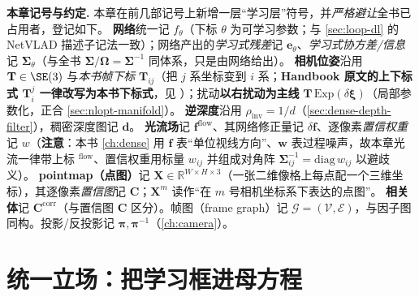 \begin{note}
\textbf{本章记号与约定.}\;
本章在前几部记号上新增一层“学习层”符号，并\emph{严格避让}全书已占用者，登记如下。
\textbf{网络}统一记 $f_\theta$（下标 $\theta$ 为可学习参数；与 \cref{sec:loop-dl} 的 NetVLAD 描述子记法一致）；网络产出的\emph{学习式残差}记 $\mathbf{e}_\theta$、\emph{学习式协方差/信息}记 $\boldsymbol\Sigma_\theta$（与全书 $\boldsymbol\Sigma/\boldsymbol\Omega=\boldsymbol\Sigma^{-1}$ 同体系，只是由网络给出）。
\textbf{相机位姿}沿用 $\mathbf{T}\in\SE(3)$ 与\emph{本书帧下标} $\mathbf{T}_{ij}$（把 $j$ 系坐标变到 $i$ 系；\textbf{Handbook 原文的上下标式 $\mathbf{T}_i^j$ 一律改写为本书下标式}，见 ）；扰动\textbf{以右扰动为主线} $\mathbf{T}\,\mathrm{Exp}(\delta\boldsymbol\xi)$（局部参数化，正合 \cref{sec:nlopt-manifold}）。
\textbf{逆深度}沿用 $\rho_{\mathrm{inv}}=1/d$（\cref{sec:dense-depth-filter}），稠密深度图记 $\mathbf{d}$。
\textbf{光流场}记 $\mathbf{f}^{\mathrm{flow}}$、其网络修正量记 $\delta\mathbf{f}$、逐像素\emph{置信权重}记 $w$（\textbf{注意}：本书 \cref{ch:dense} 用 $\mathbf{f}$ 表“单位视线方向”、$\mathbf{w}$ 表过程噪声，故本章光流一律带上标 $^{\mathrm{flow}}$、置信权重用标量 $w_{ij}$ 并组成对角阵 $\boldsymbol\Sigma_{ij}^{-1}=\mathrm{diag}\,w_{ij}$ 以避歧义）。
\textbf{pointmap（点图）}记 $\mathbf{X}\in\mathbb{R}^{W\times H\times 3}$（一张二维像格上每点配一个三维坐标），其逐像素\emph{置信图}记 $\mathbf{C}$；$\mathbf{X}^{m}$ 读作“在 $m$ 号相机坐标系下表达的点图”。
\textbf{相关体}记 $\mathbf{C}^{\mathrm{corr}}$（与置信图 $\mathbf{C}$ 区分）。帧图（frame graph）记 $\mathcal{G}=(\mathcal V,\mathcal E)$，与因子图同构。投影/反投影记 $\boldsymbol\pi,\boldsymbol\pi^{-1}$（\cref{ch:camera}）。
\end{note}

\section{统一立场：把学习框进母方程}
\label{sec:learning-frame}

